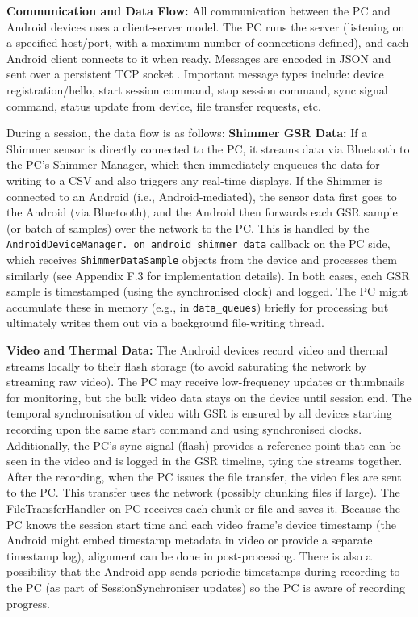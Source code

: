 \textbf{Communication and Data Flow:} All communication between the PC and Android devices uses a client-server model. The PC runs the server (listening on a specified host/port, with a maximum number of connections defined), and each Android client connects to it when ready. Messages are encoded in JSON and sent over a persistent TCP socket \cite{ref21}. Important message types include: device registration/hello, start session command, stop session command, sync signal command, status update from device, file transfer requests, etc.

During a session, the data flow is as follows: \textbf{Shimmer GSR Data:} If a Shimmer sensor is directly connected to the PC, it streams data via Bluetooth to the PC's Shimmer Manager, which then immediately enqueues the data for writing to a CSV and also triggers any real-time displays. If the Shimmer is connected to an Android (i.e., Android-mediated), the sensor data first goes to the Android (via Bluetooth), and the Android then forwards each GSR sample (or batch of samples) over the network to the PC. This is handled by the \texttt{AndroidDeviceManager.\_on\_android\_shimmer\_data} callback on the PC side, which receives \texttt{ShimmerDataSample} objects from the device and processes them similarly (see Appendix F.3 for implementation details). In both cases, each GSR sample is timestamped (using the synchronised clock) and logged. The PC might accumulate these in memory (e.g., in \texttt{data\_queues}) briefly for processing but ultimately writes them out via a background file-writing thread.

\textbf{Video and Thermal Data:} The Android devices record video and thermal streams locally to their flash storage (to avoid saturating the network by streaming raw video). The PC may receive low-frequency updates or thumbnails for monitoring, but the bulk video data stays on the device until session end. The temporal synchronisation of video with GSR is ensured by all devices starting recording upon the same start command and using synchronised clocks. Additionally, the PC's sync signal (flash) provides a reference point that can be seen in the video and is logged in the GSR timeline, tying the streams together. After the recording, when the PC issues the file transfer, the video files are sent to the PC. This transfer uses the network (possibly chunking files if large). The FileTransferHandler on PC receives each chunk or file and saves it. Because the PC knows the session start time and each video frame's device timestamp (the Android might embed timestamp metadata in video or provide a separate timestamp log), alignment can be done in post-processing. There is also a possibility that the Android app sends periodic timestamps during recording to the PC (as part of SessionSynchroniser updates) so the PC is aware of recording progress.

